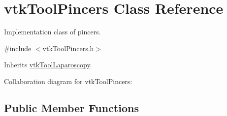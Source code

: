 \hypertarget{classvtkToolPincers}{
\section{vtkToolPincers Class Reference}
\label{classvtkToolPincers}
}


Implementation class of pincers.  




{\ttfamily \#include $<$vtkToolPincers.h$>$}



Inherits \hyperlink{classvtkToolLaparoscopy}{vtkToolLaparoscopy}.



Collaboration diagram for vtkToolPincers:\subsection*{Public Member Functions}
